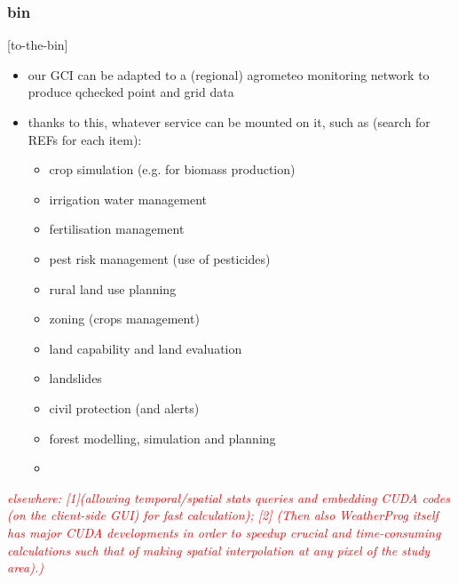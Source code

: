 \documentclass[authoryear,preprint,review,12pt]{elsarticle}
\newcommand{\note}[1]{\emph{\textcolor{red}{#1}}}
\begin{document}




\subsubsection{bin}[to-the-bin]
\begin{itemize}
    \item our GCI can be adapted to a (regional) agrometeo monitoring network to produce qchecked point and grid data
    \item thanks to this, whatever service can be mounted on it, such as (search for REFs for each item):
    \begin{itemize}
        \item crop simulation (e.g. for biomass production)
        \item irrigation water management
        \item fertilisation management
        \item pest risk management (use of pesticides)
        \item rural land use planning
        \item zoning (crops management)
        \item land capability and land evaluation
        \item landslides
        \item civil protection (and alerts)
        \item forest modelling, simulation and planning
        \item 
    \end{itemize}
\end{itemize}

\note{ elsewhere: [1](allowing temporal/spatial stats queries and embedding CUDA codes (on the client-side GUI) for fast calculation); [2] (Then also WeatherProg itself has major CUDA developments in order to speedup crucial and time-consuming calculations such that of making spatial interpolation at any pixel of the study area).) }
\end{document}
